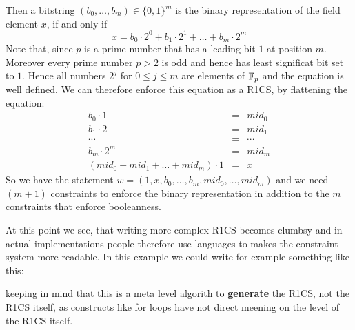 Then a bitstring $(b_0,\ldots,b_m)\in \{0,1\}^m$ is the binary representation of the field element $x$, if and only if
$$
x = b_0\cdot 2^0 + b_1\cdot 2^1 + \ldots + b_m\cdot 2^m
$$ 
Note that, since $p$ is a prime number that has a leading bit $1$ at position $m$. Moreover every prime number $p>2$ is odd and hence has least significat bit set to $1$. Hence all numbers $2^j$ for $0\leq j \leq m$ are elements of $\mathbb{F}_p$ and the equation is well defined. We can therefore enforce this equation as a R1CS, by flattening the equation: 
$$
\begin{array}{lcl}
b_0 \cdot 1 &=& mid_0\\
b_1 \cdot 2 &=& mid_1\\
\cdots & = & \cdots \\
b_m \cdot 2^m &=& mid_m\\
(mid_0 + mid_1 + \ldots + mid_m)\cdot 1 &=& x
\end{array}
$$
So we have the statement $w = (1, x, b_0,\ldots,b_m, mid_0,\ldots,mid_m)$ and we need $(m+1)$ constraints to enforce the binary representation in addition to the $m$ constraints that enforce booleanness.

At this point we see, that writing more complex R1CS becomes clumbsy and in actual implementations people therefore use languages to makes the constraint system more readable. In this example we could write for example something like this:


keeping in mind that this is a meta level algorith to \textbf{generate} the R1CS, not the R1CS itself, as constructs like for loops have not direct meening on the level of the R1CS itself.


